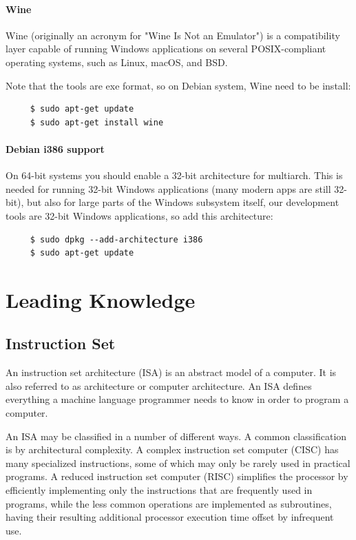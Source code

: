\documentclass{swfcthesis}
\begin{document}
\subsubsection{Wine}
\label{sec:wine}

Wine (originally an acronym for "Wine Is Not an Emulator") is a compatibility layer
capable of running Windows applications on several POSIX-compliant operating systems, such
as Linux, macOS, and  BSD.

Note that the tools are exe format, so on Debian system, Wine need to be install:
\begin{verbatim}
     $ sudo apt-get update
     $ sudo apt-get install wine
\end{verbatim}

\subsubsection{Debian i386 support}
\label{sec:debian-i386-support}

On 64-bit systems you should enable a 32-bit architecture for multiarch. This is needed
for running 32-bit Windows applications (many modern apps are
still 32-bit), but also for large parts of the Windows subsystem itself, our development
tools are 32-bit Windows applications, so add this
architecture:

\begin{verbatim}
     $ sudo dpkg --add-architecture i386
     $ sudo apt-get update
\end{verbatim}

\chapter{Leading Knowledge}
\label{cha:leading-knowledge}

\section{Instruction Set}
\label{sec:instruction-set}

An instruction set architecture (ISA) is an abstract model of a computer. It is also
referred to as architecture or computer architecture. An ISA defines everything a machine
language programmer needs to know in order to program a computer.

An ISA may be classified in a number of different ways. A common classification is by
architectural complexity. A complex instruction set computer (CISC) has many specialized
instructions, some of which may only be rarely used in practical programs. A reduced
instruction set computer (RISC) simplifies the processor by efficiently implementing only
the instructions that are frequently used in programs, while the less common operations
are implemented as subroutines, having their resulting additional processor execution time
offset by infrequent use.
\end{document}
